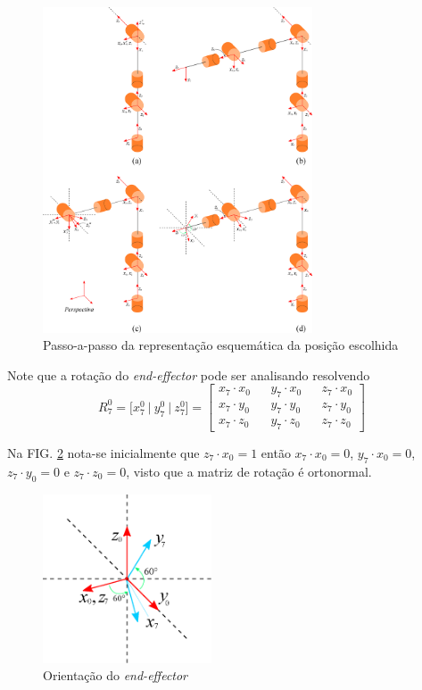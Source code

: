 \begin{figure}[h]
    \centering
    \includegraphics[width=8cm]{Imagem/validacao.eps}
    \caption{Passo-a-passo da representação esquemática da posição escolhida}
    \label{fig:condicaoescolhida}
\end{figure}

Note que a rotação do \textit{end-effector} pode ser analisando resolvendo
\begin{equation}
    R_7^0 = \Big[ x_7^0 \:\big|\: y_7^0 \:\big|\: z_7^0 \Big] = \left[\begin{array}{ccccc}
        x_7 \cdot x_0 && y_7 \cdot x_0 && z_7 \cdot x_0 \\
        x_7 \cdot y_0 && y_7 \cdot y_0 && z_7 \cdot y_0 \\
        x_7 \cdot z_0 && y_7 \cdot z_0 && z_7 \cdot z_0
    \end{array}\right]
    \label{eq:matrizR_generica}
\end{equation}

Na FIG. \ref{fig:zoom_pose_escolhido} nota-se inicialmente que $z_7 \cdot x_0 = 1$ então $x_7 \cdot x_0 = 0$, $y_7 \cdot x_0 = 0$, $z_7 \cdot y_0 = 0$ e $z_7 \cdot z_0 = 0$, visto que a matriz de rotação é ortonormal.
\begin{figure}[h]
    \centering
    \includegraphics[width=5cm]{Imagem/zoom_pos-escolhida.eps}
    \caption{Orientação do \textit{end-effector}}
    \label{fig:zoom_pose_escolhido}
\end{figure}

